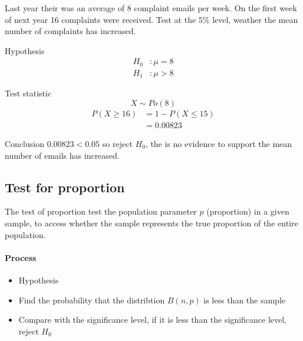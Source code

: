         \begin{example}
        {
            Last year their was an average of 8 complaint emails per week. On the first week of next year 16 complaints were received. Test at the 5\% level, weather the mean number of complaints has increased.
        }

        \begin{step}{Hypothesis}
        \begin{align*}
        H_0&: \mu = 8 \\ 
        H_1&: \mu > 8
        \end{align*}
        \end{step}

        \begin{step}{Test statistic}
        $$ X \sim Po(8) $$
        \begin{align*} 
        P(X \geq 16) &= 1 - P(X \leq 15) \\ 
        &= 0.00823 
        \end{align*}         
        \end{step}

        \begin{step}{Conclusion}
            $0.00823 < 0.05$ so reject $H_0$, the is no evidence to support the mean number of emails has increased.
        \end{step}

        \end{example}

    \newpage
    \subsection{Test for proportion}
        The test of proportion test the population parameter $p$ (proportion) in a given sample, to access whether the sample represents the true proportion of the entire population.

        \paragraph{Process}
        \begin{itemize}
        \item Hypothesis
        \item Find the probability that the distribtion $B(n, p)$ is less than the sample
        \item Compare with the significance level, if it is less than the significance level, reject $H_0$
        \end{itemize}
    
